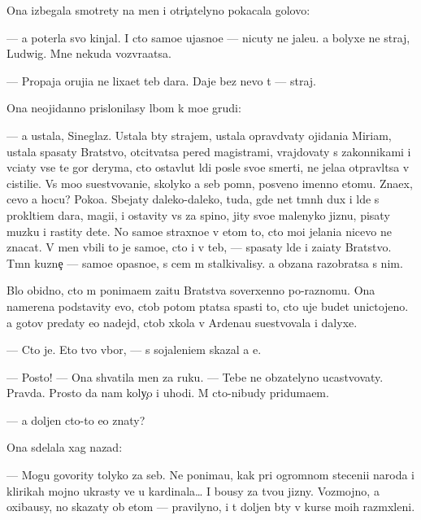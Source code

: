\documentclass[10pt]{book}
\begin{document}
Ona izbegala smotrety na men{\ia} i otri{\c}atelyno pokacala golovo{\y}:

— {\Y}a poter{\ia}la svo{\y} kinjal. I cto samo{\y}e ujasno{\y}e — nicuty ne jale{\y}u. {\Y}a bolyxe ne straj, Ludwig. Mne nekuda vozvra{\x}atsa.

— Propaja oruji{\y}a ne lixa{\y}et teb{\ia} dara. Daje bez nevo t{\yi} — straj.

Ona neojidanno prislonilasy lbom k mo{\y}e{\y} grudi:

— {\Y}a ustala, Sineglaz{\yi}{\y}. Ustala b{\yi}ty strajem, ustala opravd{\yi}vaty ojidani{\y}a Miriam, ustala spasaty Bratstvo, otcit{\yi}vatsa pered magistrami, vrajdovaty s zakonnikami i v{\yi}ci{\x}aty vse te gor{\yi} deryma, cto ostavl{\ia}{\y}ut l{\iu}di posle svo{\y}e{\y} smerti, ne jela{\y}a otpravl{\ia}tsa v cistili{\x}e. Vs{\e} mo{\y}o su{\x}estvovani{\y}e, skolyko {\y}a seb{\ia} pomn{\iu}, posv{\ia}{\x}eno imenno etomu. Zna{\y}ex, cevo {\y}a hocu? Poko{\y}a. Sbejaty daleko-daleko, tuda, gde net t{\e}mn{\yi}h dux i l{\iu}de{\y} s prokl{\ia}ti{\y}em dara, magi{\y}i, i ostavity vs{\e} za spino{\y}, jity svo{\y}e{\y} malenyko{\y} jizn{\y}u, pisaty muz{\yi}ku i rastity dete{\y}. No samo{\y}e straxno{\y}e v etom to, cto mo{\y}i jelani{\y}a nicevo ne znacat. V men{\ia} vbili to je samo{\y}e, cto i v teb{\ia}, — spasaty l{\iu}de{\y} i za{\x}i{\x}aty Bratstvo. T{\e}mn{\yi}{\y} kuzne{\c} — samo{\y}e opasno{\y}e, s cem m{\yi} stalkivalisy. {\Y}a ob{\ia}zana razobratsa s nim.

B{\yi}lo obidno, cto m{\yi} ponima{\y}em za{\x}itu Bratstva soverxenno po-raznomu. Ona namerena podstavity {\y}evo, ctob{\yi} potom p{\yi}tatsa spasti to, cto uje budet unictojeno. {\Y}a gotov predaty {\y}e{\y}o nadejd{\yi}, ctob{\yi} xkola v Ardenau su{\x}estvovala i dalyxe.

— Cto je. Eto tvo{\y} v{\yi}bor, — s sojaleni{\y}em skazal {\y}a {\y}e{\y}.

— Posto{\y}! — Ona shvatila men{\ia} za ruku. — Tebe ne ob{\ia}zatelyno ucastvovaty. Pravda. Prosto da{\y} nam koly{\c}o i uhodi. M{\yi} cto-nibudy priduma{\y}em.

— {\Y}a doljen cto-to {\y}e{\x}o znaty?

Ona sdelala xag nazad:

— Mogu govority tolyko za seb{\ia}. Ne ponima{\y}u, kak pri ogromnom steceni{\y}i naroda i klirikah mojno ukrasty ve{\x} u kardinala… I bo{\y}usy za tvo{\y}u jizny. Vozmojno, {\y}a oxiba{\y}usy, no skazaty ob etom — pravilyno, i t{\yi} doljen b{\yi}ty v kurse mo{\y}ih razm{\yi}xleni{\y}.
\end{document}
